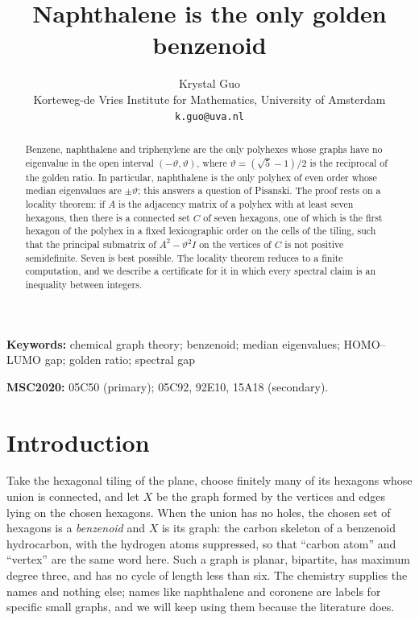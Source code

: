 \documentclass[11pt]{article}
\title{Naphthalene is the only golden benzenoid}
\author{Krystal Guo\\[2pt]
 \small Korteweg-de Vries Institute for Mathematics, University of Amsterdam\\
 \small \texttt{k.guo@uva.nl}}
\date{}
\newcommand\thetaG{\vartheta}
\theoremstyle{definition}
\begin{document}
\maketitle

\begin{abstract}
Benzene, naphthalene and triphenylene are the only polyhexes whose graphs
have no eigenvalue in the open interval $(-\thetaG,\thetaG)$,
where $\thetaG=(\sqrt5-1)/2$ is the reciprocal of the golden ratio.  In
particular, naphthalene is the only polyhex of even order whose median
eigenvalues are $\pm\thetaG$; this answers a question of Pisanski.  The proof
rests on a locality theorem: if $A$ is the adjacency matrix of a polyhex with
at least seven hexagons, then there is a connected set $C$ of seven hexagons,
one of which is the first hexagon of the polyhex in a fixed lexicographic
order on the cells of the tiling, such that the principal
submatrix of $A^{2}-\thetaG^{2}I$ on the vertices of $C$ is not positive
semidefinite.  Seven is best possible.  The locality theorem reduces to a
finite computation, and we describe a certificate for it in which every
spectral claim is an inequality between integers.
\end{abstract}

\noindent\textbf{Keywords:} chemical graph theory; benzenoid; 
median eigenvalues; HOMO--LUMO gap; golden ratio; spectral gap
%
%


\medskip
\noindent\textbf{MSC2020:} 05C50 (primary); 05C92, 92E10, 15A18
(secondary).

\section{Introduction}

Take the hexagonal tiling of the plane, choose finitely many of its hexagons
whose union is connected, and let $X$ be the graph formed by the vertices and
edges lying on the chosen hexagons.  When the union has no holes, the chosen
set of hexagons is a \textsl{benzenoid} and $X$ is its graph: the carbon
skeleton of a benzenoid hydrocarbon, with the
hydrogen atoms suppressed, so that ``carbon atom'' and ``vertex'' are the same
word here.  Such a graph is planar, bipartite, has maximum degree three, and
has no cycle of length less than six.  The chemistry supplies the names and
nothing else; names like naphthalene and coronene are labels for specific
small graphs, and we will keep using them because the literature does.
\end{document}
